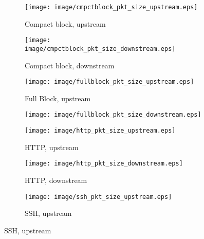 \begin{figure}[h]
\begin{subfigure}{.24\linewidth}
\texttt{[image: image/cmpctblock\_pkt\_size\_upstream.eps]}
\caption{Compact block, upstream}
\label{fig:aggregate_pkt_size_upstream_cmpct}
\end{subfigure}
\begin{subfigure}{.24\linewidth}
\texttt{[image: image/cmpctblock\_pkt\_size\_downstream.eps]}
\caption{Compact block, downstream}
\label{fig:aggregate_pkt_size_downstream_cmpct}
\end{subfigure}
\begin{subfigure}{.24\linewidth}
\texttt{[image: image/fullblock\_pkt\_size\_upstream.eps]}
\caption{Full Block, upstream}
\label{fig:aggregate_pkt_size_upstream_full}
\end{subfigure}
\begin{subfigure}{.24\linewidth}
\texttt{[image: image/fullblock\_pkt\_size\_downstream.eps]}
\label{fig:aggregate_pkt_size_downstream_full}
\end{subfigure}
\begin{subfigure}{.24\linewidth}
\centering
\texttt{[image: image/http\_pkt\_size\_upstream.eps]}
\caption{HTTP, upstream}
\label{fig:http_pkt_size_upstream}
\end{subfigure}
\begin{subfigure}{.24\linewidth}
\texttt{[image: image/http\_pkt\_size\_downstream.eps]}
\caption{HTTP, downstream}
\label{fig:http_pkt_size_downstream}
\end{subfigure}
\begin{subfigure}{.24\linewidth}
\texttt{[image: image/ssh\_pkt\_size\_upstream.eps]}
\caption{SSH, upstream}
\label{fig:ssh_pkt_size_upstream}
\end{subfigure}

\end{figure}
